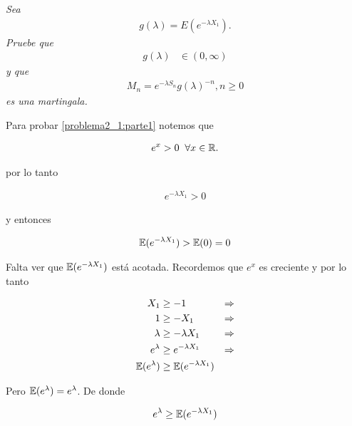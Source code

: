 \emph{
    Sea
        \begin{align}
                g(\lambda)=E(e^{- \lambda X_1}).
        \end{align} 
    Pruebe que 
    \null
        \begin{align}
                g(\lambda)    &\in (0,\infty)\label{problema2_1:parte1}
        \end{align}
    \null
    y que
    \null
        \begin{align}
                M_n=e^{-\lambda S_n}g(\lambda)^{-n},n\geq 0
        \end{align}
    \null
    es una martingala.
}

\afterstatement

    Para probar \eqref{problema2_1:parte1} notemos que

    \begin{align}
        e^x > 0 \;\; \forall x \in \mathbb{R}.
    \end{align}\pn

    por lo tanto

    \begin{align}
        e^{-\lambda X_1} > 0
    \end{align}\pn

    y entonces

    \begin{align}
        \mathbb{E}(e^{-\lambda X_1}) >\mathbb{E}(0) = 0
    \end{align}\pn

    Falta ver que $\mathbb{E}(e^{-\lambda X_1})$ está acotada. Recordemos que $e^x$ es creciente y por lo tanto

    \begin{align}
        X_1                &\geq     -1                       & \Rightarrow\\
        1                  &\geq     - X_1                    & \Rightarrow\\
        \lambda            &\geq     - \lambda X_1            & \Rightarrow\\
        e^{\lambda}        &\geq     e^{- \lambda X_1}        & \Rightarrow\\
        \mathbb{E}(e^{\lambda})    &\geq     \mathbb{E}(e^{- \lambda X_1})
    \end{align}\pn
    
    Pero $\mathbb{E}(e^{\lambda}) = e^{\lambda}$. De donde
    
    \begin{align}
        e^{\lambda} \geq  \mathbb{E}(e^{- \lambda X_1})
    \end{align}\pn    
    
